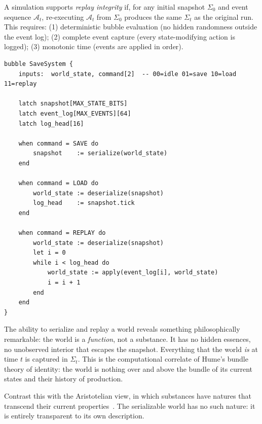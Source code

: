 \documentclass[11pt,a4paper,openany]{book}
\theoremstyle{plain}
\theoremstyle{definition}
\theoremstyle{remark}
\newenvironment{implementation}{%
  \begin{mdframed}[
    linecolor=sphereamber!80, backgroundcolor=sphereamber!5,
    linewidth=1pt, innertopmargin=8pt, innerbottommargin=8pt,
    innerleftmargin=10pt, innerrightmargin=10pt,
    skipabove=10pt, skipbelow=6pt
  ]%
  \setlength{\parindent}{0pt}%
  \noindent{\textcolor{sphereamber!80!black}{\textbf{Implementation}}}\par\smallskip\ignorespaces
}{\end{mdframed}}
\newenvironment{perspective}{%
  \begin{mdframed}[
    linecolor=spherered!40, backgroundcolor=spherered!4,
    linewidth=1pt, innertopmargin=8pt, innerbottommargin=8pt,
    innerleftmargin=10pt, innerrightmargin=10pt,
    skipabove=10pt, skipbelow=6pt
  ]%
  \setlength{\parindent}{0pt}%
  \noindent{\textcolor{spherered}{\textbf{Perspective}}}\par\smallskip\ignorespaces
}{\end{mdframed}}
\newenvironment{mechanic}[1]{%
  \begin{tcolorbox}[
    title={\textbf{World Mechanic:} #1},
    colback=sphereteal!5,
    colframe=sphereteal,
    fonttitle=\bfseries\color{white},
    coltitle=white,
    sharp corners,
    breakable,
    before upper={\normalfont\setlength{\parindent}{0pt}\tolerance=9999\hbadness=9999}
  ]
}{\end{tcolorbox}}
\newcommand{\Spbox}{\textsc{Spherepop}\xspace}
\newcommand{\Spbox}{\textbf{Spherepop}\xspace}
\begin{document}
\begin{mechanic}{Replay Integrity}
  A simulation supports \emph{replay integrity} if, for any initial
  snapshot $\Sigma_0$ and event sequence $\mathcal{A}_t$,
  re-executing $\mathcal{A}_t$ from $\Sigma_0$ produces the same
  $\Sigma_t$ as the original run. This requires:
  (1) deterministic bubble evaluation (no hidden randomness outside
  the event log);
  (2) complete event capture (every state-modifying action is logged);
  (3) monotonic time (events are applied in order).
\end{mechanic}

\begin{implementation}
\begin{lstlisting}[caption={Snapshot and restore in \Spbox }]
bubble SaveSystem {
    inputs:  world_state, command[2]  -- 00=idle 01=save 10=load 11=replay

    latch snapshot[MAX_STATE_BITS]
    latch event_log[MAX_EVENTS][64]
    latch log_head[16]

    when command = SAVE do
        snapshot    := serialize(world_state)
    end

    when command = LOAD do
        world_state := deserialize(snapshot)
        log_head    := snapshot.tick
    end

    when command = REPLAY do
        world_state := deserialize(snapshot)
        let i = 0
        while i < log_head do
            world_state := apply(event_log[i], world_state)
            i = i + 1
        end
    end
}
\end{lstlisting}
\end{implementation}

\begin{perspective}
  The ability to serialize and replay a world reveals something
  philosophically remarkable: the world is a \emph{function}, not a
  substance. It has no hidden essences, no unobserved interior that
  escapes the snapshot. Everything that the world \emph{is} at time $t$
  is captured in $\Sigma_t$. This is the computational correlate of
  Hume's bundle theory of identity: the world is nothing over and above
  the bundle of its current states and their history of production.

  Contrast this with the Aristotelian view, in which substances have
  natures that transcend their current properties~\cite{Aristotle}.
  The serializable world has no such nature: it is entirely transparent
  to its own description.
\end{perspective}
\end{document}
